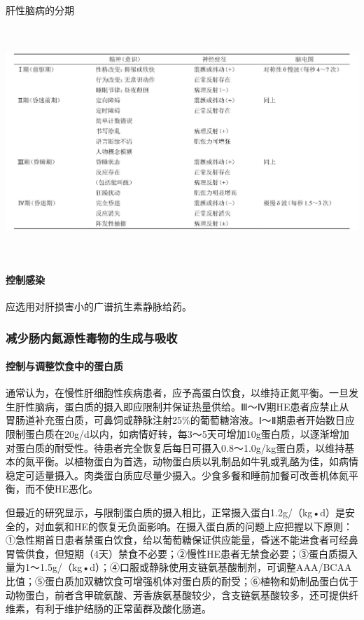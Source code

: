 \begin{table}[htbp]
\centering
\caption{肝性脑病的分期}
\label{tab38-2}
\includegraphics[width=6.78125in,height=3.40625in]{./images/Image00151.jpg}
\end{table}

\paragraph{控制感染}

应选用对肝损害小的广谱抗生素静脉给药。

\subsubsection{减少肠内氮源性毒物的生成与吸收}

\paragraph{控制与调整饮食中的蛋白质}

通常认为，在慢性肝细胞性疾病患者，应予高蛋白饮食，以维持正氮平衡。一旦发生肝性脑病，蛋白质的摄入即应限制并保证热量供给。Ⅲ～Ⅳ期HE患者应禁止从胃肠道补充蛋白质，可鼻饲或静脉注射25\%的葡萄糖溶液。Ⅰ～Ⅱ期患者开始数日应限制蛋白质在20g/d以内，如病情好转，每3～5天可增加10g蛋白质，以逐渐增加对蛋白质的耐受性。待患者完全恢复后每日可摄入0.8～1.0g/kg蛋白质，以维持基本的氮平衡。以植物蛋白为首选，动物蛋白质以乳制品如牛乳或乳酪为佳，如病情稳定可适量摄入。肉类蛋白质应尽量少摄入。少食多餐和睡前加餐可改善机体氮平衡，而不使HE恶化。

但最近的研究显示，与限制蛋白质的摄入相比，正常摄入蛋白1.2g/（kg•d）是安全的，对血氨和HE的恢复无负面影响。在摄入蛋白质的问题上应把握以下原则：①急性期首日患者禁蛋白饮食，给以葡萄糖保证供应能量，昏迷不能进食者可经鼻胃管供食，但短期（4天）禁食不必要；②慢性HE患者无禁食必要；③蛋白质摄入量为1～1.5g/（kg•d）；④口服或静脉使用支链氨基酸制剂，可调整AAA/BCAA比值；⑤蛋白质加双糖饮食可增强机体对蛋白质的耐受；⑥植物和奶制品蛋白优于动物蛋白，前者含甲硫氨酸、芳香族氨基酸较少，含支链氨基酸较多，还可提供纤维素，有利于维护结肠的正常菌群及酸化肠道。

